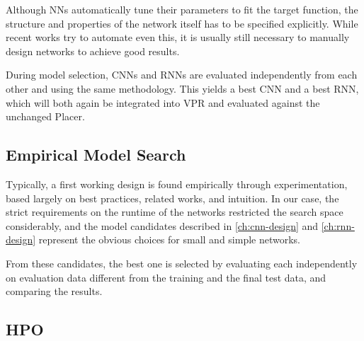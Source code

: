 Although \glspl{NN} automatically tune their parameters to fit the target function, the structure and properties of the network itself has to be specified explicitly. While recent works try to automate even this, it is usually still necessary to manually design networks to achieve good results.

During model selection, \glspl{CNN} and \glspl{RNN} are evaluated independently from each other and using the same methodology. This yields a best \gls{CNN} and a best \gls{RNN}, which will both again be integrated into \gls{VPR} and evaluated against the unchanged Placer.  

\subsection{Empirical Model Search}

Typically, a first working design is found empirically through experimentation, based largely on best practices, related works, and intuition.\cite{TODO} In our case, the strict requirements on the runtime of the networks restricted the search space considerably, and the model candidates described in \ref{ch:cnn-design} and \ref{ch:rnn-design} represent the obvious choices for small and simple networks.

From these candidates, the best one is selected by evaluating each independently on evaluation data different from the training and the final test data, and comparing the results.

\subsection{\gls{HPO}}


